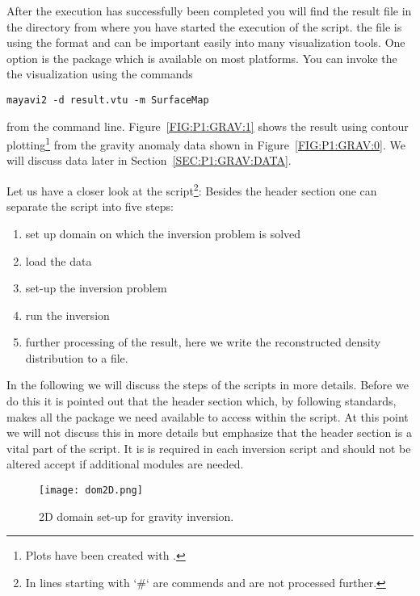 After the execution has successfully been completed you will find the result file  in the directory
from where you have started the execution of the script. the file is using the \VTK format and can be important 
easily into many visualization tools. One option is the \mayavi package which is available on most platforms. You can invoke the
the visualization using the commands
\begin{verbatim}
mayavi2 -d result.vtu -m SurfaceMap
\end{verbatim}
from the command line. Figure~\ref{FIG:P1:GRAV:1} shows the result using contour plotting\footnote{Plots
have been created with \VisIt.} from the gravity anomaly data shown in Figure~\ref{FIG:P1:GRAV:0}. We will 
discuss data later in Section~\ref{SEC:P1:GRAV:DATA}.

Let us have a closer look at the script\footnote{In \python lines starting with `\#` are commends and are not processed further.}: Besides the header section one can separate the script into five steps:
\begin{enumerate}
 \item set up domain on which the inversion problem is solved
 \item load the data 
\item set-up the inversion problem
\item run the inversion
\item further processing of the result, here we write the reconstructed density distribution to a file.
\end{enumerate}
In the following we will discuss the steps of the scripts in more details. Before we do this it is pointed out that
the header section which, by following \python standards, makes all the package we need available to access within the script. At this
point we will not discuss this in more details but emphasize that the header section is a vital part of the script. It is is required 
in each \downunder inversion script and should not be altered accept if additional modules are needed. 

\begin{figure}
\centering
\texttt{[image: dom2D.png]}
\caption{2D domain set-up for gravity inversion.}
\label{FIG:P1:GRAV:2}
\end{figure}

